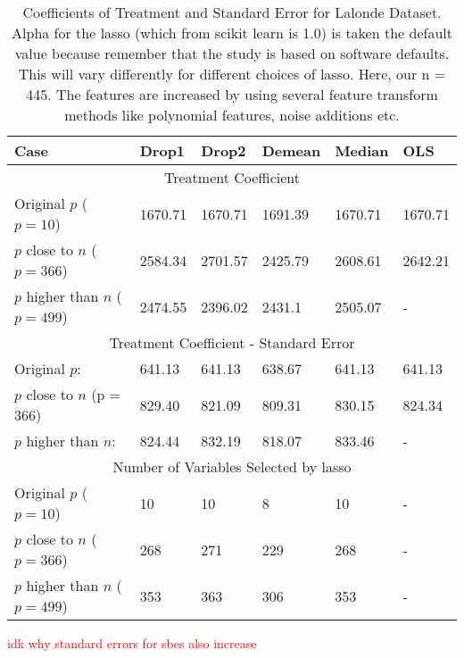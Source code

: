 \begin{table}[h!]
\renewcommand{\arraystretch}{1.5}
\centering
\begin{tabular}{||l l l l l l||} 
 \hline
 \hline
 Case & Drop1 & Drop2 & Demean & Median & OLS \\ [0.5ex] 
 \hline \hline
 \multicolumn{6}{||c||}{Treatment Coefficient} \\ [0.5ex]
 Original $p$ ($p = 10$) & 1670.71 & 1670.71 & 1691.39 & 1670.71 & 1670.71 \\ 
 $p$ close to $n$ ($p = 366$) & 2584.34 & 2701.57 & 2425.79 & 2608.61 & 2642.21 \\
 $p$ higher than $n$ ($p= 499$) & 2474.55 & 2396.02 & 2431.1 & 2505.07 & - \\ [1ex] 
 \hline
 \multicolumn{6}{||c||}{Treatment Coefficient - Standard Error} \\ [0.5ex]
 Original $p$: & 641.13 & 641.13 & 638.67 & 641.13 & 641.13 \\ 
 $p$ close to $n$ (p = 366) & 829.40 & 821.09 & 809.31 & 830.15 & 824.34 \\
 $p$ higher than $n$: & 824.44 & 832.19 & 818.07 & 833.46 & - \\ [1ex] 
 \hline
 \multicolumn{6}{||c||}{Number of Variables Selected by lasso} \\ [0.5ex]
 Original $p$ ($p = 10$) & 10 & 10 & 8 & 10 & - \\ 
 $p$ close to $n$ ($p = 366$) & 268 & 271 & 229 & 268 & - \\
 $p$ higher than $n$ ($p= 499$) & 353 & 363 & 306 & 353 & - \\ [1ex] 
 \hline \hline
\end{tabular}
\caption{Coefficients of Treatment and Standard Error for Lalonde Dataset.  \\
Alpha for the lasso (which from scikit learn is 1.0) is taken the default value because remember that the study is based on software defaults. This will vary differently for different choices of lasso. Here, our n = 445. The features are increased by using several feature transform methods like polynomial features, noise additions etc.  }
\textcolor{red}{idk why standard errors for sbes also increase}
\label{table:1}
\end{table}



